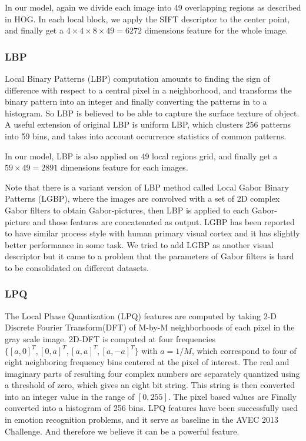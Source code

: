 \documentclass[conference]{IEEEtran}
\begin{document}
In our model, again we divide each image into 49 overlapping regions as described in HOG. In each local block, we apply the SIFT descriptor to the center point, and finally get a $4\times4\times8\times49=6272$ dimensions feature for the whole image.

\subsubsection{LBP}
Local Binary Patterns (LBP) \cite{LBP2014} computation amounts to finding the sign of difference with respect to a central pixel in a neighborhood, and transforms the binary pattern into an integer and finally converting the patterns in to a histogram. So LBP is believed to be able to capture the surface texture of object. A useful extension of original LBP is uniform LBP, which clusters 256 patterns into 59 bins, and takes into account occurrence statistics of common patterns.

In our model, LBP is also applied on 49 local regions grid, and finally get a $59\times49=2891$ dimensions feature for each images.

Note that there is a variant version of LBP method called Local Gabor Binary Patterns (LGBP), where the images are convolved with a set of 2D complex Gabor filters to obtain Gabor-pictures, then LBP is applied to each Gabor-picture and those features are concatenated as output. LGBP has been reported to have similar process style with human primary visual cortex \cite{visual1980} and it has slightly better performance in some task. We tried to add LGBP as another visual descriptor but it came to a problem that the parameters of Gabor filters is hard to be consolidated on different datasets.

\subsubsection{LPQ}
The Local Phase Quantization (LPQ) features are computed by taking 2-D Discrete Fourier Transform(DFT) of M-by-M neighborhoods of each pixel in the gray scale image. 2D-DFT is computed at four frequencies $\{[a,0]^T,[0,a]^T,[a,a]^T,[a,-a]^T\}$ with $a=1/M$, which correspond to four of eight neighboring frequency bins centered at the pixel of interest. The real and imaginary parts of resulting four complex numbers are separately quantized using a threshold of zero, which gives an eight bit string. This string is then converted into an integer value in the range of $[0,255]$. The pixel based values are Finally converted into a histogram of 256 bins. LPQ features have been successfully used in emotion recognition problems, and it serve as baseline in the AVEC 2013 Challenge. And therefore we believe it can be a powerful feature.
\end{document}
